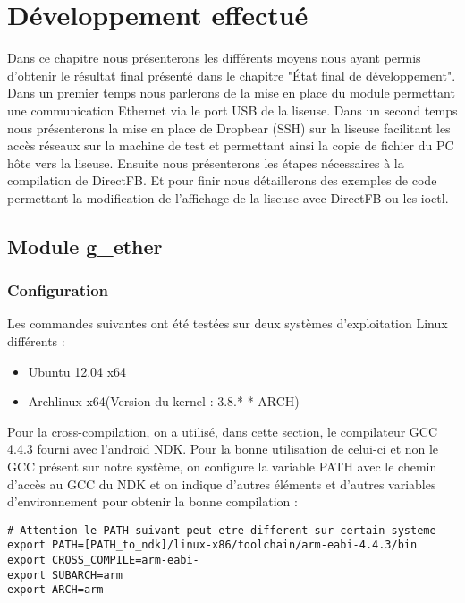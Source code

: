\chapter{Développement effectué}

Dans ce chapitre nous présenterons les différents moyens nous ayant permis d'obtenir le résultat final présenté dans le chapitre "État final de développement".\\ 
Dans un premier temps nous parlerons de la mise en place du module permettant une communication Ethernet via le port USB de la liseuse. Dans un second temps nous présenterons la mise en place de Dropbear (SSH) sur la liseuse facilitant les accès réseaux sur la machine de test et permettant ainsi la copie de fichier du PC hôte vers la liseuse. Ensuite nous présenterons les étapes nécessaires à la compilation de DirectFB. Et pour finir nous détaillerons des exemples de code permettant la modification de l'affichage de la liseuse avec DirectFB ou les ioctl.

\section{Module g_ether}
\subsection{Configuration}

Les commandes suivantes ont été testées sur deux systèmes d'exploitation Linux différents : 
\begin{itemize}

\item Ubuntu 12.04 x64 
\item Archlinux x64(Version du kernel : 3.8.*-*-ARCH)

\end{itemize}


Pour la cross-compilation, on a utilisé, dans cette section, le compilateur GCC 4.4.3 fourni avec l'android NDK. Pour la bonne utilisation de celui-ci et non le GCC présent sur notre système, on configure la variable PATH avec le chemin d'accès au GCC du NDK et on indique d'autres éléments et d'autres variables d'environnement pour obtenir la bonne compilation :

\begin{lstlisting}
# Attention le PATH suivant peut etre different sur certain systeme
export PATH=[PATH_to_ndk]/linux-x86/toolchain/arm-eabi-4.4.3/bin 
export CROSS_COMPILE=arm-eabi-
export SUBARCH=arm
export ARCH=arm
\end{lstlisting}

